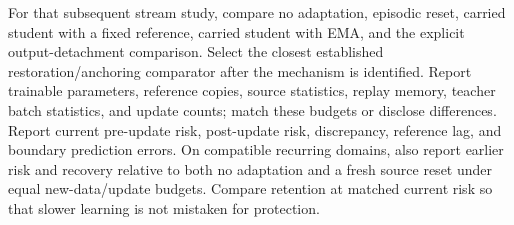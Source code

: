 \documentclass[11pt,a4paper]{article}
\begin{document}
For that subsequent stream study, compare no adaptation, episodic reset,
carried student with a fixed
reference, carried student with EMA, and the explicit output-detachment
comparison. Select the closest established restoration/anchoring comparator
after the mechanism is identified. Report trainable parameters, reference
copies, source statistics, replay memory, teacher batch statistics, and
update counts; match these budgets or disclose differences. Report current
pre-update risk, post-update risk, discrepancy, reference lag, and boundary
prediction errors. On compatible recurring domains, also report earlier
risk and recovery relative to both no adaptation and a fresh source reset
under equal new-data/update budgets. Compare retention at matched current
risk so that slower learning is not mistaken for protection.
\end{document}
